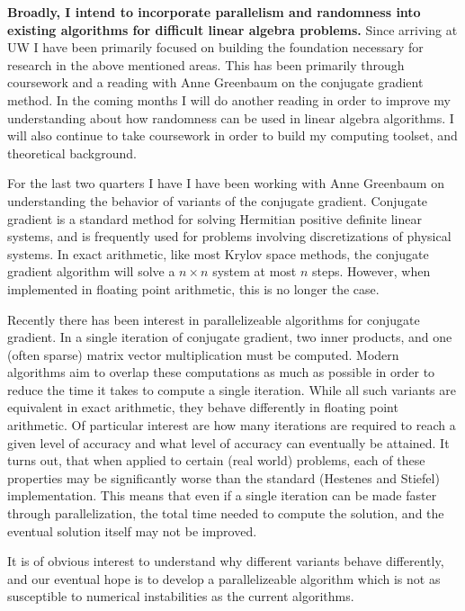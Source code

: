 \documentclass[11pt]{article}
\begin{document}
\maketitle
\vspace{2em}

\textbf{Broadly, I intend to incorporate parallelism and randomness into existing algorithms for difficult linear algebra problems.}
Since arriving at UW I have been primarily focused on building the foundation necessary for research in the above mentioned areas. This has been primarily through coursework and a reading with Anne Greenbaum on the conjugate gradient method. In the coming months I will do another reading in order to improve my understanding about how randomness can be used in linear algebra algorithms. I will also continue to take coursework in order to build my computing toolset, and theoretical background.

For the last two quarters I have I have been working with Anne Greenbaum on understanding the behavior of variants of the conjugate gradient. 
Conjugate gradient is a standard method for solving Hermitian positive definite linear systems, and is frequently used for problems involving discretizations of physical systems. In exact arithmetic, like most Krylov space methods, the conjugate gradient algorithm will solve a \( n\times n \) system at most \( n \) steps. However, when implemented in floating point arithmetic, this is no longer the case.


Recently there has been interest in parallelizeable algorithms for conjugate gradient. In a single iteration of conjugate gradient, two inner products, and one (often sparse) matrix vector multiplication must be computed. Modern algorithms aim to overlap these computations as much as possible in order to reduce the time it takes to compute a single iteration.
While all such variants are equivalent in exact arithmetic, they behave differently in floating point arithmetic. Of particular interest are how many iterations are required to reach a given level of accuracy and what level of accuracy can eventually be attained.
It turns out, that when applied to certain (real world) problems, each of these properties may be significantly worse than the standard (Hestenes and Stiefel) implementation. This means that even if a single iteration can be made faster through parallelization, the total time needed to compute the solution, and the eventual solution itself may not be improved. 

It is of obvious interest to understand why different variants behave differently, and our eventual hope is to develop a parallelizeable algorithm which is not as susceptible to numerical instabilities as the current algorithms. 
\end{document}
